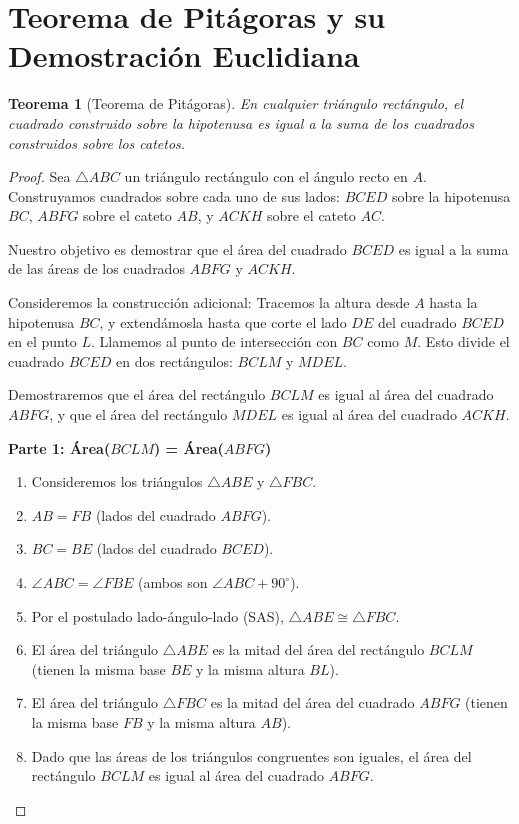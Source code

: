 \documentclass{article}
\theoremstyle{plain}
\newtheorem{theorem}{Teorema}[section]
\newtheorem{proof}[theorem]{Demostración}
\begin{document}
\section{Teorema de Pitágoras y su Demostración Euclidiana}

\begin{theorem}[Teorema de Pitágoras]
En cualquier triángulo rectángulo, el cuadrado construido sobre la hipotenusa es igual a la suma de los cuadrados construidos sobre los catetos.
\end{theorem}

\begin{proof}
Sea $\triangle ABC$ un triángulo rectángulo con el ángulo recto en $A$. Construyamos cuadrados sobre cada uno de sus lados: $BCED$ sobre la hipotenusa $BC$, $ABFG$ sobre el cateto $AB$, y $ACKH$ sobre el cateto $AC$.

Nuestro objetivo es demostrar que el área del cuadrado $BCED$ es igual a la suma de las áreas de los cuadrados $ABFG$ y $ACKH$.

Consideremos la construcción adicional: Tracemos la altura desde $A$ hasta la hipotenusa $BC$, y extendámosla hasta que corte el lado $DE$ del cuadrado $BCED$ en el punto $L$. Llamemos al punto de intersección con $BC$ como $M$. Esto divide el cuadrado $BCED$ en dos rectángulos: $BCLM$ y $MDEL$.

Demostraremos que el área del rectángulo $BCLM$ es igual al área del cuadrado $ABFG$, y que el área del rectángulo $MDEL$ es igual al área del cuadrado $ACKH$.

\textbf{Parte 1: Área($BCLM$) = Área($ABFG$)}
\begin{enumerate}
    \item Consideremos los triángulos $\triangle ABE$ y $\triangle FBC$.
    \item $AB = FB$ (lados del cuadrado $ABFG$).
    \item $BC = BE$ (lados del cuadrado $BCED$).
    \item $\angle ABC = \angle FBE$ (ambos son $\angle ABC + 90^\circ$).
    \item Por el postulado lado-ángulo-lado (SAS), $\triangle ABE \cong \triangle FBC$.
    \item El área del triángulo $\triangle ABE$ es la mitad del área del rectángulo $BCLM$ (tienen la misma base $BE$ y la misma altura $BL$).
    \item El área del triángulo $\triangle FBC$ es la mitad del área del cuadrado $ABFG$ (tienen la misma base $FB$ y la misma altura $AB$).
    \item Dado que las áreas de los triángulos congruentes son iguales, el área del rectángulo $BCLM$ es igual al área del cuadrado $ABFG$.
\end{enumerate}


\end{proof}
\end{document}

